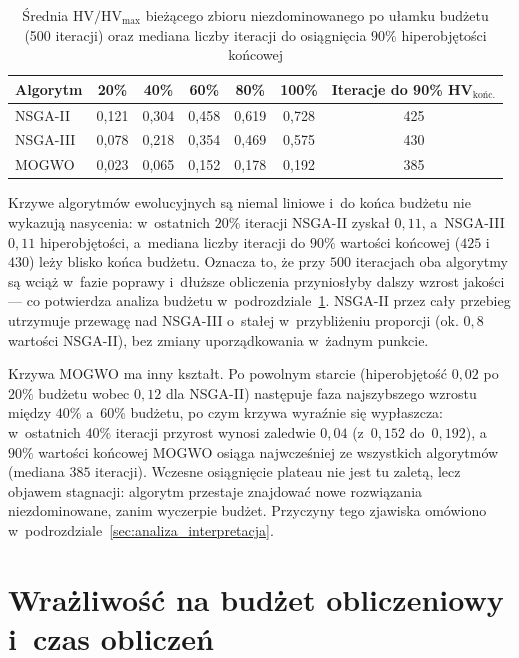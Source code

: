 \begin{table}[htbp]
    \centering
    \caption{Średnia $\mathrm{HV}/\mathrm{HV}_{\max}$ bieżącego zbioru niezdominowanego po ułamku budżetu (500 iteracji) oraz mediana liczby iteracji do osiągnięcia $90\%$ hiperobjętości końcowej}
    \label{tab:convergence}
    \begin{tabular}{l c c c c c c}
        \hline
        Algorytm & 20\% & 40\% & 60\% & 80\% & 100\% & Iteracje do 90\% HV$_{\text{końc.}}$ \\
        \hline
        NSGA-II & 0{,}121 & 0{,}304 & 0{,}458 & 0{,}619 & 0{,}728 & 425 \\
        NSGA-III & 0{,}078 & 0{,}218 & 0{,}354 & 0{,}469 & 0{,}575 & 430 \\
        MOGWO & 0{,}023 & 0{,}065 & 0{,}152 & 0{,}178 & 0{,}192 & 385 \\
        \hline
    \end{tabular}
\end{table}

Krzywe algorytmów ewolucyjnych są niemal liniowe i~do końca budżetu nie
wykazują nasycenia: w~ostatnich $20\%$ iteracji NSGA-II zyskał $0{,}11$,
a~NSGA-III $0{,}11$ hiperobjętości, a~mediana liczby iteracji do $90\%$ wartości
końcowej ($425$ i~$430$) leży blisko końca budżetu. Oznacza to, że przy $500$
iteracjach oba algorytmy są wciąż w~fazie poprawy i~dłuższe obliczenia
przyniosłyby dalszy wzrost jakości --- co potwierdza analiza budżetu
w~podrozdziale~\ref{sec:analiza_budzet}. NSGA-II przez cały przebieg utrzymuje
przewagę nad NSGA-III o~stałej w~przybliżeniu proporcji (ok. $0{,}8$ wartości
NSGA-II), bez zmiany uporządkowania w~żadnym punkcie.

Krzywa MOGWO ma inny kształt. Po powolnym starcie (hiperobjętość $0{,}02$ po
$20\%$ budżetu wobec $0{,}12$ dla NSGA-II) następuje faza najszybszego wzrostu
między $40\%$ a~$60\%$ budżetu, po czym krzywa wyraźnie się wypłaszcza: w~ostatnich
$40\%$ iteracji przyrost wynosi zaledwie $0{,}04$ (z~$0{,}152$ do~$0{,}192$),
a~$90\%$ wartości końcowej MOGWO osiąga najwcześniej ze wszystkich algorytmów
(mediana $385$ iteracji). Wczesne osiągnięcie plateau nie jest tu zaletą, lecz
objawem stagnacji: algorytm przestaje znajdować nowe rozwiązania niezdominowane,
zanim wyczerpie budżet. Przyczyny tego zjawiska omówiono
w~podrozdziale~\ref{sec:analiza_interpretacja}.

\section{Wrażliwość na budżet obliczeniowy i~czas obliczeń}
\label{sec:analiza_budzet}

